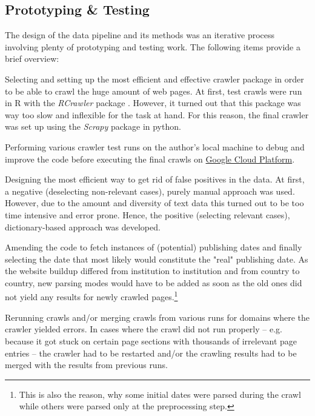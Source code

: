 \subsection{Prototyping \& Testing}\label{Prototyping and Testing}
The design of the data pipeline and its methods was an iterative process involving plenty of prototyping and testing work. The following items provide a brief overview:
\begin{compactitem}
\item Selecting and setting up the most efficient and effective crawler package in order to be able to crawl the huge amount of web pages. At first, test crawls were run in R with the \textit{RCrawler} package \parencite{Khalil2017}. However, it turned out that this package was way too slow and inflexible for the task at hand. For this reason, the final crawler was set up using the \textit{Scrapy} package \parencite{Scrapy2018} in python. 
\item Performing various crawler test runs on the author's local machine to debug and improve the code before executing the final crawls on \href{https://cloud.google.com/}{Google Cloud Platform}.
\item Designing the most efficient way to get rid of false positives in the data. At first, a negative (deselecting non-relevant cases), purely manual approach was used. However, due to the amount and diversity of text data this turned out to be too time intensive and error prone. Hence, the positive (selecting relevant cases), dictionary-based approach was developed.
\item Amending the code to fetch instances of (potential) publishing dates and finally selecting the date that most likely would constitute the "real" publishing date. As the website buildup differed from institution to institution and from country to country, new parsing modes would have to be added as soon as the old ones did not yield any results for newly crawled pages.\footnote{This is also the reason, why some initial dates were parsed during the crawl while others were parsed only at the preprocessing step.}
\item Rerunning crawls and/or merging crawls from various runs for domains where the crawler yielded errors. In cases where the crawl did not run properly – e.g. because it got stuck on certain page sections with thousands of irrelevant page entries – the crawler had to be restarted and/or the crawling results had to be merged with the results from previous runs. 
\end{compactitem}



